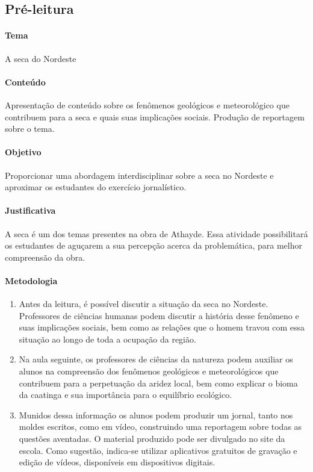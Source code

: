 \documentclass[12pt]{extarticle}
\begin{document}
\subsection{Pré-leitura}

\paragraph{Tema} A seca do Nordeste

\paragraph{Conteúdo} Apresentação de conteúdo sobre os fenômenos geológicos
e meteorológico que contribuem para a seca e quais suas implicações sociais.
Produção de reportagem sobre o tema.

\paragraph{Objetivo} Proporcionar uma abordagem interdisciplinar sobre a seca
no Nordeste e aproximar os estudantes do exercício jornalístico.

\paragraph{Justificativa} A seca é um dos temas presentes na obra de Athayde.
Essa atividade possibilitará os estudantes de aguçarem a sua percepção acerca
da problemática, para melhor compreensão da obra.

\paragraph{Metodologia}

\begin{enumerate}

\item Antes da leitura, é possível discutir a situação da seca no Nordeste.
  Professores de ciências humanas podem discutir a história desse fenômeno
  e suas implicações sociais, bem como as relações que o homem travou com essa
  situação ao longo de toda a ocupação da região.

\item Na aula seguinte, os professores de ciências da natureza podem auxiliar
  os alunos na compreensão dos fenômenos geológicos e meteorológicos que
  contribuem para a perpetuação da aridez local, bem como explicar o bioma da
  caatinga e sua importância para o equilíbrio ecológico. 

\item Munidos dessa informação os alunos podem produzir um jornal, tanto nos
  moldes escritos, como em vídeo, construindo uma reportagem sobre todas as
  questões aventadas. O material produzido pode ser divulgado no site da
  escola. Como sugestão, indica-se utilizar aplicativos gratuitos de gravação
  e edição de vídeos, disponíveis em dispositivos digitais.

\end{enumerate}
\end{document}
